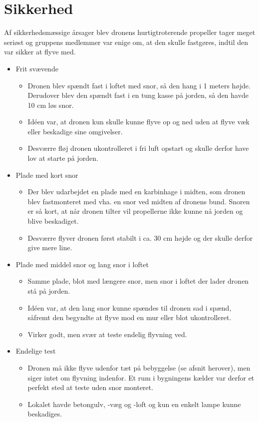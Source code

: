 \documentclass[Main]{subfiles}
\begin{document}
\section{Sikkerhed}
Af sikkerhedsmæssige årsager blev dronens hurtigtroterende propeller tager meget seriøst og gruppens medlemmer var enige om, at den skulle fastgøres, indtil den var sikker at flyve med.
\begin{itemize}
\item Frit svævende
	\begin{itemize}
	\item Dronen blev spændt fast i loftet med snor, så den hang i 1 meters højde. Derudover blev den spændt fast i en tung kasse på jorden, så den havde 10 cm løs snor. 
	\item Idéen var, at dronen kun skulle kunne flyve op og ned uden at flyve væk eller beskadige sine omgivelser.
	\item Desværre fløj dronen ukontrolleret i fri luft opstart og skulle derfor have lov at starte på jorden.
	\end{itemize}
	
\item Plade med kort snor
	\begin{itemize}
	\item Der blev udarbejdet en plade med en karbinhage i midten, som dronen blev fastmonteret med vha. en snor ved midten af dronens bund.
	Snoren er så kort, at når dronen tilter vil propellerne ikke kunne nå jorden og blive beskadiget.
	\item Desværre flyver dronen først stabilt i ca. 30 cm højde og der skulle derfor give mere line.
	\end{itemize}
	
\item Plade med middel snor og lang snor i loftet
	\begin{itemize}
	\item Samme plade, blot med længere snor, men snor i loftet der lader dronen stå på jorden.
	\item Idéen var, at den lang snor kunne spændes til dronen sad i spænd, såfremt den begyndte at flyve mod en mur eller blot ukontrolleret.
	\item Virker godt, men svær at teste endelig flyvning ved.
	\end{itemize}

\item Endelige test
	\begin{itemize}
	\item Dronen må ikke flyve udenfor tæt på bebyggelse (se afsnit herover), men siger intet om flyvning indenfor. Et rum i bygningens kælder var derfor et perfekt sted at teste uden snor monteret.
	\item Lokalet havde betongulv, -væg og -loft og kun en enkelt lampe kunne beskadiges. 
	\end{itemize}
\end{itemize}
\end{document}
